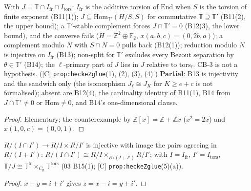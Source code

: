\begin{lemma}\label{inf:heckez-glue}
  \leanok
  With $J=\mathbb T\cap I_{\mathrm{fr}}\cap I_{\mathrm{tors}}$: $I_{\mathrm{fr}}$ is the additive torsion of $\mathrm{End}$ when $S$ is the torsion of finite
  exponent (B11(1)); $J\subseteq\mathrm{Hom}_{\mathbb T'}(H/S,S)$ for commutative $\mathbb T\supseteq\mathbb T'$ (B11(2), the upper bound); a $\mathbb T'$-stable
  complement forces $J\cap\mathbb T'=0$ (B12(3), the lower bound), and the converse fails ($H=\mathbb Z^2\oplus\mathbb F_2$, $x(a,b,c)=(0,2b,\bar a)$);
  a complement modulo $N$ with $S\cap N=0$ pulls back (B12(1)); reduction modulo $N$ is injective on $I_{\mathrm{fr}}$ (B13); non-split for $\mathbb T'$
  excludes every Bezout separation by $\theta\in\mathbb T'$ (B14); the $\ell$-primary part of $J$ lies in $J$ relative to $\mathrm{tors}_\ell$.
  CB-3 is not a hypothesis. ([C] \texttt{prop:heckeZglue}(1), (2), (3), (4).) \textbf{Partial}: B13 is injectivity and the sandwich only (the isomorphism $J_\ell\cong J_K$ for $K\ge e+c$ is not formalised); absent are B12(4), the cardinality identity of B11(1), B14 from $J\cap\mathbb T'\ne0$ or $\mathrm{Hom}\ne0$, and B14's one-dimensional clause.
\end{lemma}
\begin{proof}
  \leanok
  Elementary; the counterexample by $\mathbb Z[x]=\mathbb Z+\mathbb Zx$ ($x^2=2x$) and $x(1,0,c)=(0,0,1)$.
\end{proof}

\begin{lemma}\label{inf:heckez-fibre}
  \leanok
  $R/(I\cap I')\to R/I\times R/I'$ is injective with image the pairs agreeing in $R/(I+I')$: $R/(I\cap I')\cong R/I\times_{R/(I+I')}R/I'$; with
  $I=I_{\mathrm{fr}}$, $I'=I_{\mathrm{tors}}$, $\mathbb T/J\cong\mathbb T^{\mathrm{fr}}\times_{C_{\mathrm{ft}}}\mathbb T^{\mathrm{tors}}$ (03 B15(1); [C]
  \texttt{prop:heckeZglue}(5)(a)).
\end{lemma}
\begin{proof}
  \leanok
  $x-y=i+i'$ gives $z=x-i=y+i'$.
\end{proof}

